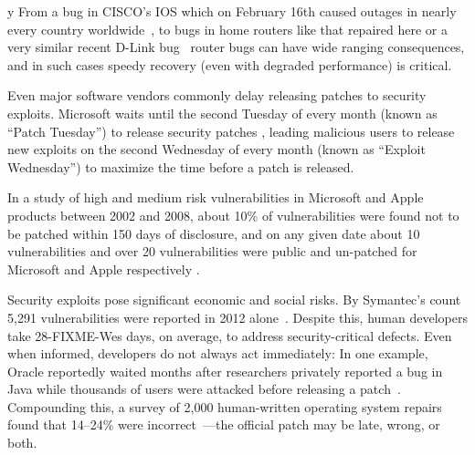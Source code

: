 \documentclass{sigcomm-alternate}
\begin{document}
y %
From a bug in CISCO's IOS which on February 16th caused outages in
nearly every country worldwide~\cite{biggest-router-bug}, to bugs in
home routers like that repaired here or a very similar recent D-Link
bug~\cite{d-link} router bugs can have wide ranging consequences, and
in such cases speedy recovery (even with degraded performance) is
critical.

Even major software vendors commonly delay releasing patches to
security exploits.  Microsoft waits until the second Tuesday of every
month (known as ``Patch Tuesday'') to release security patches
\cite{lemos2003microsoft}, leading malicious users to release new
exploits on the second Wednesday of every month (known as ``Exploit
Wednesday'') to maximize the time before a patch is released.

In a study of high and medium risk vulnerabilities in Microsoft and
Apple products between 2002 and 2008, about 10\% of
vulnerabilities were found not to be patched within 150 days of
disclosure, and on any given date about 10 vulnerabilities and over 20
vulnerabilities were public and un-patched for Microsoft and Apple
respectively \cite{frei20080}.



Security exploits pose significant economic and social risks. By Symantec's
count 5,291 vulnerabilities were reported in 2012
alone~\cite{symantec2013threat}. Despite this, human developers take
28-FIXME-Wes
days, on average, to address security-critical defects. Even
when informed, developers do not always act immediately:  In one example,
Oracle reportedly waited months after researchers privately reported a bug
in Java while thousands of users were attacked before releasing a
patch~\cite{greenberg2012oracle}.  Compounding this, a survey of 2,000
human-written operating system repairs found that 14--24\% were
incorrect~\cite{fixes-become-bugs}---the official patch may be late, wrong,
or both.  
\end{document}
